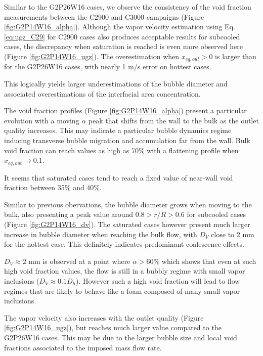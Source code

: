 Similar to the G2P26W16 cases, we observe the consistency of the void fraction measurements between the C2900 and C3000 campaigns (Figure \ref{fig:G2P14W16_alpha}). Although the vapor velocity estimation using Eq. \ref{eq:ugz_C29} for C2900 cases also produces acceptable results for subcooled cases, the discrepancy when saturation is reached is even more observed here (Figure \ref{fig:G2P14W16_ugz}). The overestimation when $x_{eq,out}>0$ is larger than for the G2P26W16 cases, with nearly 1 m/s error on hottest cases. 

This logically yields larger underestimations of the bubble diameter and associated overestimations of the interfacial area concentration.

\npar

The void fraction profiles (Figure \ref{fig:G2P14W16_alpha}) present a particular evolution with a moving $\alpha$ peak that shifts from the wall to the bulk as the outlet quality increases. This may indicate a particular bubble dynamics regime inducing transverse bubble migration and accumulation far from the wall. Bulk void fraction can reach values as high as 70\% with a flattening profile when $x_{eq,out} \to 0.1$.

\begin{remark*}{}
It seems that saturated cases tend to reach a fixed value of near-wall void fraction between 35\% and 40\%.
\end{remark*}

\npar

Similar to previous obervations, the bubble diameter grows when moving to the bulk, also presenting a peak value around $0.8 > r/R > 0.6$ for subcooled cases (Figure \ref{fig:G2P14W16_dv}). The saturated cases however present much larger increase in bubble diameter when reaching the bulk flow, with $D_{V}$ close to 2 mm for the hottest case. This definitely indicates predominant coalescence effects.

\begin{remark*}{}
$D_{V}\approx 2$ mm is observed at a point where $\alpha >60\%$ which shows that even at such high void fraction values, the flow is still in a bubbly regime with small vapor inclusions ($D_{V} \approx 0.1 D_{h}$). However such a high void fraction will lead to flow regimes that are likely to behave like a foam composed of many small vapor inclusions.
\end{remark*}

\npar

The vapor velocity also increases with the outlet quality (Figure \ref{fig:G2P14W16_ugz}), but reaches much larger value compared to the G2P26W16 cases. This may be due to the larger bubble size and local void fractions associated to the imposed mass flow rate.


